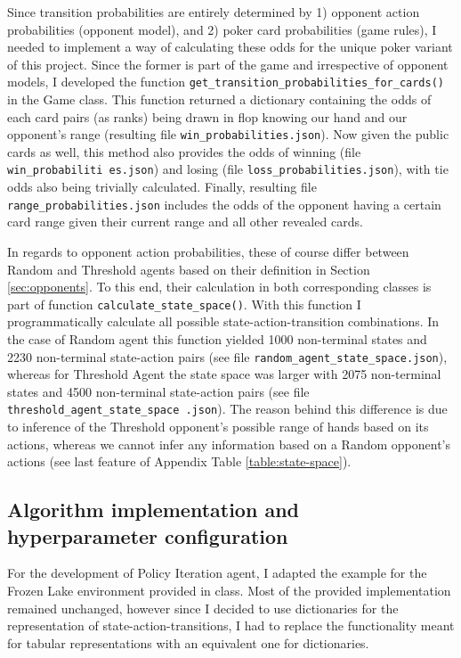 Since transition probabilities are entirely determined by 1) opponent action probabilities (opponent model), and 2) poker card probabilities (game rules), I needed to implement a way of calculating these odds for the unique poker variant of this project. Since the former is part of the game and irrespective of opponent models, I developed the function \Verb|get_transition_probabilities_for_cards()| in the Game class. This function returned a dictionary containing the odds of each card pairs (as ranks) being drawn in flop knowing our hand and our opponent's range (resulting file \Verb|win_probabilities.json|). Now given the public cards as well, this method also provides the odds of winning (file \texttt{win\_probabiliti es.json}) and losing (file \Verb|loss_probabilities.json|), with tie odds also being trivially calculated. Finally, resulting file \Verb|range_probabilities.json| includes the odds of the opponent having a certain card range given their current range and all other revealed cards.

In regards to opponent action probabilities, these of course differ between Random and Threshold agents based on their definition in Section \ref{sec:opponents}. To this end, their calculation in both corresponding classes is part of function \Verb|calculate_state_space()|. With this function I programmatically calculate all possible state-action-transition combinations. In the case of Random agent this function yielded 1000 non-terminal states and 2230 non-terminal state-action pairs (see file \Verb|random_agent_state_space.json|), whereas for Threshold Agent the state space was larger with 2075 non-terminal states and 4500 non-terminal state-action pairs (see file \texttt{threshold\_agent\_state\_space .json}). The reason behind this difference is due to inference of the Threshold opponent's possible range of hands based on its actions, whereas we cannot infer any information based on a Random opponent's actions (see last feature of Appendix Table \ref{table:state-space}).

\subsection{Algorithm implementation and hyperparameter configuration}

For the development of Policy Iteration agent, I adapted the example for the Frozen Lake environment provided in class. Most of the provided implementation remained unchanged, however since I decided to use dictionaries for the representation of state-action-transitions, I had to replace the functionality meant for tabular representations with an equivalent one for dictionaries.

